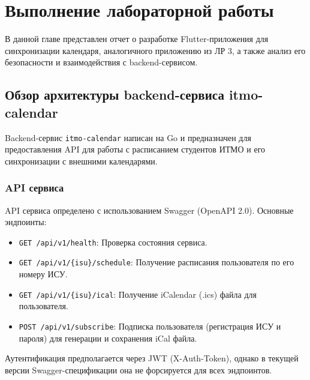 \chapter{Выполнение лабораторной работы}
\label{ch:laba}

В данной главе представлен отчет о разработке Flutter-приложения для синхронизации календаря, аналогичного приложению из ЛР 3, а также анализ его безопасности и взаимодействия с backend-сервисом.

\section{Обзор архитектуры backend-сервиса itmo-calendar}
Backend-сервис \texttt{itmo-calendar} написан на Go и предназначен для предоставления API для работы с расписанием студентов ИТМО и его синхронизации с внешними календарями.

\subsection{API сервиса}
API сервиса определено с использованием Swagger (OpenAPI 2.0). Основные эндпоинты:
\begin{itemize}
    \item \texttt{GET /api/v1/health}: Проверка состояния сервиса.
    \item \texttt{GET /api/v1/\{isu\}/schedule}: Получение расписания пользователя по его номеру ИСУ.
    \item \texttt{GET /api/v1/\{isu\}/ical}: Получение iCalendar (.ics) файла для пользователя.
    \item \texttt{POST /api/v1/subscribe}: Подписка пользователя (регистрация ИСУ и пароля) для генерации и сохранения iCal файла.
\end{itemize}
Аутентификация предполагается через JWT (X-Auth-Token), однако в текущей версии Swagger-спецификации она не форсируется для всех эндпоинтов.

